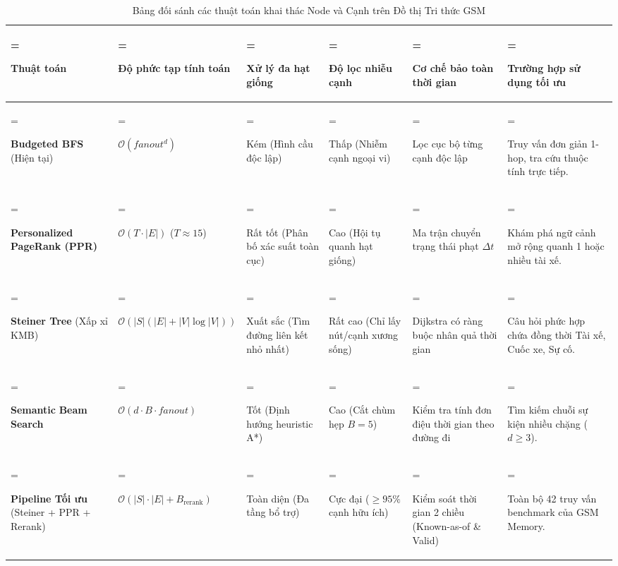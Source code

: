 \documentclass[a4paper,11pt]{article}
\begin{document}
\begin{table}[!htbp]
\centering
\scriptsize
\caption{Bảng đối sánh các thuật toán khai thác Node và Cạnh trên Đồ thị Tri thức GSM}
\label{tab:graph-algorithms}
\vspace{0.15cm}
\setlength{\tabcolsep}{3pt}
\renewcommand{\arraystretch}{1.2}
\begin{tabularx}{\textwidth}{@{}
    >{\hsize=1.00\hsize\linewidth=\hsize\raggedright\arraybackslash}X
    >{\hsize=1.35\hsize\linewidth=\hsize\raggedright\arraybackslash}X
    >{\hsize=0.85\hsize\linewidth=\hsize\raggedright\arraybackslash}X
    >{\hsize=0.85\hsize\linewidth=\hsize\raggedright\arraybackslash}X
    >{\hsize=0.95\hsize\linewidth=\hsize\raggedright\arraybackslash}X
    >{\hsize=1.00\hsize\linewidth=\hsize\raggedright\arraybackslash}X
    @{}}
\toprule
\textbf{Thuật toán} & \textbf{Độ phức tạp tính toán} & \textbf{Xử lý đa hạt giống} & \textbf{Độ lọc nhiễu cạnh} & \textbf{Cơ chế bảo toàn thời gian} & \textbf{Trường hợp sử dụng tối ưu} \\
\midrule
\textbf{Budgeted BFS} \newline (Hiện tại) & $\mathcal{O}(fanout^d)$ & Kém (Hình cầu độc lập) & Thấp (Nhiễm cạnh ngoại vi) & Lọc cục bộ từng cạnh độc lập & Truy vấn đơn giản 1-hop, tra cứu thuộc tính trực tiếp. \\
\addlinespace[3pt]
\textbf{Personalized PageRank (PPR)} & $\mathcal{O}(T \cdot |E|)$ ($T \approx 15$) & Rất tốt (Phân bố xác suất toàn cục) & Cao (Hội tụ quanh hạt giống) & Ma trận chuyển trạng thái phạt $\Delta t$ & Khám phá ngữ cảnh mở rộng quanh 1 hoặc nhiều tài xế. \\
\addlinespace[3pt]
\textbf{Steiner Tree} \newline (Xấp xỉ KMB) & $\mathcal{O}(|S|(|E| + |V|\log|V|))$ & Xuất sắc (Tìm đường liên kết nhỏ nhất) & Rất cao (Chỉ lấy nút/cạnh xương sống) & Dijkstra có ràng buộc nhân quả thời gian & Câu hỏi phức hợp chứa đồng thời Tài xế, Cuốc xe, Sự cố. \\
\addlinespace[3pt]
\textbf{Semantic} \newline \textbf{Beam Search} & $\mathcal{O}(d \cdot B \cdot fanout)$ & Tốt (Định hướng heuristic A*) & Cao (Cắt chùm hẹp $B=5$) & Kiểm tra tính đơn điệu thời gian theo đường đi & Tìm kiếm chuỗi sự kiện nhiều chặng ($d \ge 3$). \\
\addlinespace[3pt]
\textbf{Pipeline Tối ưu} \newline (Steiner + PPR + Rerank) & $\mathcal{O}(|S| \cdot |E| + B_{\text{rerank}})$ & Toàn diện (Đa tầng bổ trợ) & Cực đại ($\ge 95\%$ cạnh hữu ích) & Kiểm soát thời gian 2 chiều (Known-as-of \& Valid) & Toàn bộ 42 truy vấn benchmark của GSM Memory. \\
\bottomrule
\end{tabularx}
\end{table}
\end{document}
